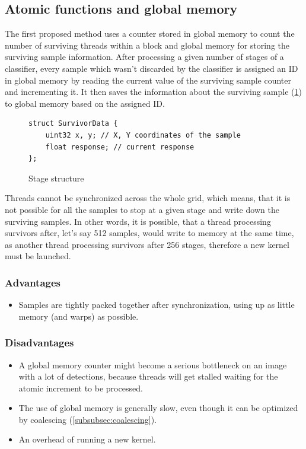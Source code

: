 \subsection{Atomic functions and global memory} \label{subsec:afgm}

The first proposed method uses a counter stored in global memory to count the number of surviving threads within a block and global memory for storing the surviving sample information. After processing a given number of stages of a classifier, every sample which wasn't discarded by the classifier is assigned an ID in global memory by reading the current value of the surviving sample counter and incrementing it. It then saves the information about the surviving sample (\ref{fig:survivordata}) to global memory based on the assigned ID.

\begin{figure}[h!] \label{fig:survivordata}
\begin{verbatim}
struct SurvivorData {
    uint32 x, y; // X, Y coordinates of the sample
    float response; // current response
};
\end{verbatim}
\caption{Stage structure}
\end{figure}

Threads cannot be synchronized across the whole grid, which means, that it is not possible for all the samples to stop at a given stage and write down the surviving samples. In other words, it is possible, that a thread processing survivors after, let's say 512 samples, would write to memory at the same time, as another thread processing survivors after 256 stages, therefore a new kernel must be launched.

\subsubsection{Advantages}

\begin{itemize}
	\item Samples are tightly packed together after synchronization, using up as little memory (and warps) as possible.
\end{itemize}

\subsubsection{Disadvantages}

\begin{itemize}
	\item A global memory counter might become a serious bottleneck on an image with a lot of detections, because threads will get stalled waiting for the atomic increment to be processed.
	\item The use of global memory is generally slow, even though it can be optimized by coalescing (\ref{subsubsec:coalescing}).
	\item An overhead of running a new kernel.
\end{itemize}

